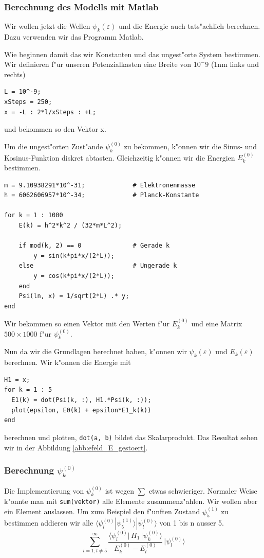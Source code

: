 \begin{refsection}
\subsubsection{Berechnung des Modells mit Matlab}

Wir wollen jetzt die Wellen $\psi_k(\varepsilon)$ und die Energie auch tats"achlich berechnen.
Dazu verwenden wir das Programm Matlab.

Wie beginnen damit das wir Konstanten und das ungest"orte System bestimmen.
Wir definieren f"ur unseren Potenzialkasten eine Breite von $10^-9$ (1nm links und rechts)
\begin{lstlisting}[style=Matlab]
L = 10^-9;
xSteps = 250;
x = -L : 2*l/xSteps : +L;
\end{lstlisting}
und bekommen so den Vektor x.

Um die ungest"orten Zust"ande $\psi_k^{(0)}$ zu bekommen, k"onnen wir die Sinus- und Kosinus-Funktion diskret abtasten.
Gleichzeitig k"onnen wir die Energien $E_k^{(0)}$ bestimmen.
\begin{lstlisting}[style=Matlab]
m = 9.10938291*10^-31;             # Elektronenmasse
h = 6062606957*10^-34;             # Planck-Konstante

for k = 1 : 1000
    E(k) = h^2*k^2 / (32*m*L^2);
    
    if mod(k, 2) == 0              # Gerade k
        y = sin(k*pi*x/(2*L));
    else                           # Ungerade k
        y = cos(k*pi*x/(2*L));
    end
    Psi(ln, x) = 1/sqrt(2*L) .* y;
end
\end{lstlisting}
Wir bekommen so einen Vektor mit den Werten f"ur $E_k^{(0)}$
und eine Matrix $500 \times 1000$ f"ur $\psi_k^{(0)}$.

Nun da wir die Grundlagen berechnet haben, k"onnen wir $\psi_k(\varepsilon)$ und $E_k(\varepsilon)$ berechnen.
Wir k"onnen die Energie mit
\begin{lstlisting}[style=Matlab]
H1 = x;
for k = 1 : 5
  E1(k) = dot(Psi(k, :), H1.*Psi(k, :));
  plot(epsilon, E0(k) + epsilon*E1_k(k))
end
\end{lstlisting}
berechnen und plotten, \verb|dot(a, b)| bildet das Skalarprodukt.
Das Resultat sehen wir in der Abbildung \ref{abb:efeld_E_gestoert}.

\subsubsection{Berechnung $\psi_k^{(0)}$} %

Die Implementierung von $\psi_k^{(0)}$ ist wegen $\sum$ etwas schwieriger.
Normaler Weise k"onnte man mit \verb|sum(vektor)| alle Elemente zusammenz"ahlen.
Wir wollen aber ein Element auslassen.
Um zum Beispiel den f"unften Zustand $\psi_5^{(1)}$ zu bestimmen addieren wir alle 
$\langle\psi_l^{(0)}|\psi_5^{(1)}\rangle|\psi_l^{(0)}\rangle$
 von 1 bis n ausser 5.
\begin{equation}
  \sum_{l=1 ; l\ne 5}^{\infty}
    \frac{\langle \psi_l^{(0)}|\, H_1 \,|\psi_k^{(0)}\rangle}{E_k^{(0)}-E_l^{(0)}}
        \,
    |\psi_l^{(0)}\rangle
\end{equation}


\end{refsection}
